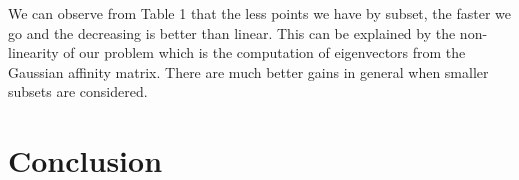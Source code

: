 \documentclass[]{svmult}
\begin{document}
We can observe from Table 1 that the less points we have by subset, the faster
we go and the decreasing is better than linear. This can be explained by the
non-linearity of our problem which is the computation of eigenvectors from the
Gaussian affinity matrix. There are much better gains in general when smaller
subsets are considered.


\vspace{-0.7cm}
\section{Conclusion}
\vspace{-0.3cm}
\end{document}
